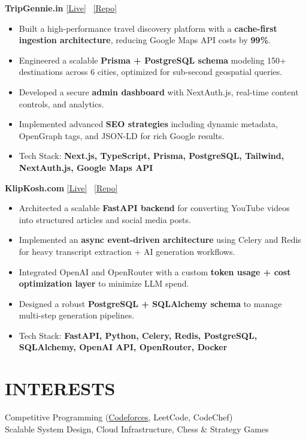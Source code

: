 \documentclass[a4paper,10pt]{article}
\begin{document}
\vspace{0.5em}
\noindent
\textbf{TripGennie.in}
\hfill
\href{https://tripgennie.in}{\textcolor{mainblue}{[Live]}} \,
\href{https://github.com/theweekendworld-engg/trip-gennie}{\textcolor{mainblue}{[Repo]}}
\vspace{-0.4em}
\begin{itemize}[leftmargin=1.5em, itemsep=0.25em]
  \item Built a high-performance travel discovery platform with a \textbf{cache-first ingestion architecture}, reducing Google Maps API costs by \textbf{99\%}.
  \item Engineered a scalable \textbf{Prisma + PostgreSQL schema} modeling 150+ destinations across 6 cities, optimized for sub-second geospatial queries.
  \item Developed a secure \textbf{admin dashboard} with NextAuth.js, real-time content controls, and analytics.
  \item Implemented advanced \textbf{SEO strategies} including dynamic metadata, OpenGraph tags, and JSON-LD for rich Google results.
  \item Tech Stack:\textbf{ Next.js, TypeScript, Prisma, PostgreSQL, Tailwind, NextAuth.js, Google Maps API}
\end{itemize}

\vspace{0.5em}
\noindent
\textbf{KlipKosh.com}
\hfill
\href{https://klipkosh.com}{\textcolor{mainblue}{[Live]}} \,
\href{https://github.com/theweekendworld-engg/klipkosh-UI}{\textcolor{mainblue}{[Repo]}}
\vspace{-0.4em}
\begin{itemize}[leftmargin=1.5em, itemsep=0.25em]
  \item Architected a scalable \textbf{FastAPI backend} for converting YouTube videos into structured articles and social media posts.
  \item Implemented an \textbf{async event-driven architecture} using Celery and Redis for heavy transcript extraction + AI generation workflows.
  \item Integrated OpenAI and OpenRouter with a custom \textbf{token usage + cost optimization layer} to minimize LLM spend.
  \item Designed a robust \textbf{PostgreSQL + SQLAlchemy schema} to manage multi-step generation pipelines.
  \item Tech Stack: \textbf{FastAPI, Python, Celery, Redis, PostgreSQL, SQLAlchemy, OpenAI API, OpenRouter, Docker}
\end{itemize}

\section*{INTERESTS}
Competitive Programming (\href{https://codeforces.com/profile/ryukk19}{\textcolor{mainblue}{Codeforces}}, LeetCode, CodeChef) \\
Scalable System Design, Cloud Infrastructure, Chess \& Strategy Games
\end{document}
